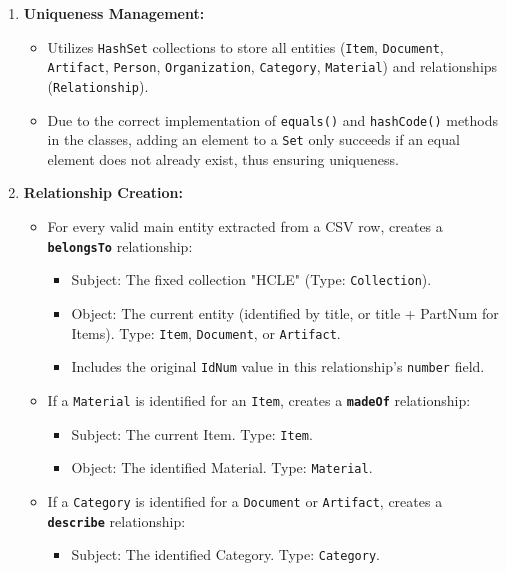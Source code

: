 \begin{enumerate}
    \item \textbf{Uniqueness Management:}
        \begin{itemize}
            \item Utilizes \texttt{HashSet} collections to store all entities (\texttt{Item}, \texttt{Document}, \texttt{Artifact}, \texttt{Person}, \texttt{Organization}, \texttt{Category}, \texttt{Material}) and relationships (\texttt{Relationship}).
            \item Due to the correct implementation of \texttt{equals()} and \texttt{hashCode()} methods in the classes, adding an element to a \texttt{Set} only succeeds if an equal element does not already exist, thus ensuring uniqueness.
        \end{itemize}

    \item \textbf{Relationship Creation:}
        \begin{itemize}
            \item For every valid main entity extracted from a CSV row, creates a \textbf{\texttt{belongsTo}} relationship:
                \begin{itemize}
                    \item Subject: The fixed collection "HCLE" (Type: \texttt{Collection}).
                    \item Object: The current entity (identified by title, or title + PartNum for Items). Type: \texttt{Item}, \texttt{Document}, or \texttt{Artifact}.
                    \item Includes the original \texttt{IdNum} value in this relationship's \texttt{number} field.
                \end{itemize}
            \item If a \texttt{Material} is identified for an \texttt{Item}, creates a \textbf{\texttt{madeOf}} relationship:
                \begin{itemize}
                    \item Subject: The current Item. Type: \texttt{Item}.
                    \item Object: The identified Material. Type: \texttt{Material}.
                \end{itemize}
            \item If a \texttt{Category} is identified for a \texttt{Document} or \texttt{Artifact}, creates a \textbf{\texttt{describe}} relationship:
                \begin{itemize}
                    \item Subject: The identified Category. Type: \texttt{Category}.

\end{itemize}
\end{itemize}
\end{enumerate}
